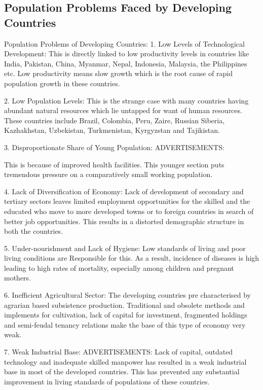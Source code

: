 \documentclass[a4paper,12pt]{article}
\begin{document}
\subsection{Population Problems Faced by Developing Countries}
Population Problems of Developing Countries:
1. Low Levels of Technological Development:
This is directly linked to low productivity levels in countries like India, Pakistan, China, Myanmar, Nepal, Indonesia, Malaysia, the Philippines etc. Low productivity means slow growth which is the root cause of rapid population growth in these countries.

2. Low Population Levels:
This is the strange case with many countries having abundant natural resources which lie untapped for want of human resources. These countries include Brazil, Colombia, Peru, Zaire, Russian Siberia, Kazhakhstan, Uzbekistan, Turkmenistan, Kyrgyzstan and Tajikistan.

3. Disproportionate Share of Young Population:
ADVERTISEMENTS:


 
This is because of improved health facilities. This younger section puts tremendous pressure on a comparatively small working population.

4. Lack of Diversification of Economy:
Lack of development of secondary and tertiary sectors leaves limited employment opportunities for the skilled and the educated who move to more developed towns or to foreign countries in search of better job opportunities. This results in a distorted demographic structure in both the countries.

5. Under-nourishment and Lack of Hygiene:
Low standards of living and poor living conditions are Responsible for this. As a result, incidence of diseases is high leading to high rates of mortality, especially among children and pregnant mothers.

6. Inefficient Agricultural Sector:
The developing countries pre characterised by agrarian based subsistence production. Traditional and obsolete methods and implements for cultivation, lack of capital for investment, fragmented holdings and semi-feudal tenancy relations make the base of this type of economy very weak.

7. Weak Industrial Base:
ADVERTISEMENTS:
Lack of capital, outdated technology and inadequate skilled manpower has resulted in a weak industrial base in most of the developed countries. This has prevented any substantial improvement in living standards of populations of these countries.
\end{document}
